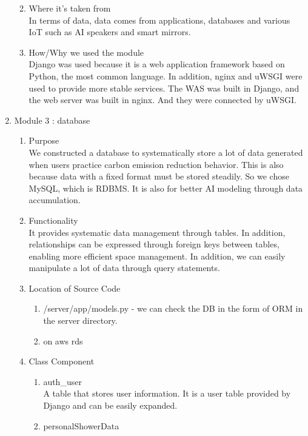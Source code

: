 \documentclass[11pt, conference]{IEEEtran}
\begin{document}
\begin{enumerate}[label=\arabic*]
\begin{enumerate}[label=\alph*]
\begin{enumerate}
        \end{enumerate}
        \item Where it's taken from\\
        In terms of data, data comes from applications, databases and various IoT such as AI speakers and smart mirrors.
        \item How/Why we used the module\\
        Django was used because it is a web application framework based on Python, the most common language. In addition, nginx and uWSGI were used to provide more stable services. The WAS was built in Django, and the web server was built in nginx. And they were connected by uWSGI.
    \end{enumerate}
    
    \item {\large{Module 3 : database}}
    \begin{enumerate}[label=\alph*]
        \item Purpose\\
        We constructed a database to systematically store a lot of data generated when users practice carbon emission reduction behavior.  This is also because data with a fixed format must be stored steadily. So we chose MySQL, which is RDBMS. It is also for better AI modeling through data accumulation.
        \item Functionality\\
        It provides systematic data management through tables. In addition, relationships can be expressed through foreign keys between tables, enabling more efficient space management. In addition, we can easily manipulate a lot of data through query statements.
        \item Location of Source Code
        \begin{enumerate}
            \item /server/app/models.py - we can check the DB in the form of ORM in the server directory. 
            \item on aws rds
        \end{enumerate}
        \item Class Component
        \begin{enumerate}
            \item auth\_user\\
            A table that stores user information. It is a user table provided by Django and can be easily expanded.
            \item personalShowerData\\

\end{enumerate}
\end{enumerate}
\end{enumerate}
\end{document}
